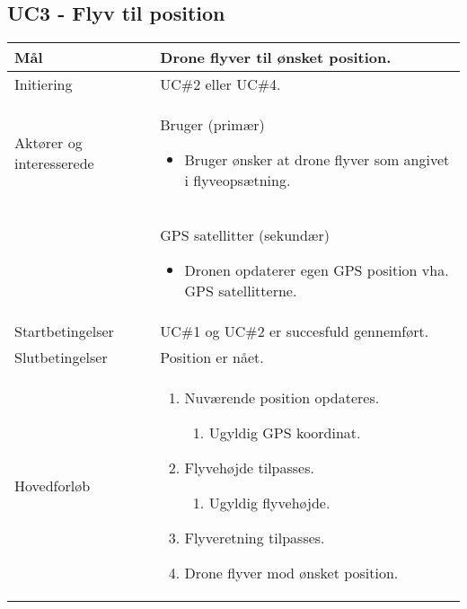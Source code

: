 \subsection*{UC3 - Flyv til position}

\begin{table}[H]
\begin{tabular}{| p{3cm}| p{11.5cm}|}
\hline


Mål	 							& Drone flyver til ønsket position. \\\hline
Initiering 							& UC\#2 eller UC\#4. \\\hline
Aktører og \newline interesserede			& Bruger (primær) 

										\begin{itemize}
											\item Bruger ønsker at drone flyver som angivet i flyveopsætning.
										\end{itemize} \\  
										
										& GPS satellitter (sekundær) 

										\begin{itemize}
											\item Dronen opdaterer egen GPS position vha. GPS satellitterne.
										\end{itemize} \\ \hline
Startbetingelser							& UC\#1 og UC\#2 er succesfuld gennemført. \\\hline
Slutbetingelser						& Position er nået. \\\hline
Hovedforløb				&
 
									\renewcommand{\labelenumi}{\arabic{enumi}.}
									\renewcommand{\labelenumii}{\Roman{enumii}:}

									\begin{enumerate}[topsep=0.0cm, leftmargin=0.5cm]
										\item Nuværende position opdateres.
											\begin{enumerate}[partopsep=4cm, topsep=0cm, leftmargin=1cm]
												\item Ugyldig GPS koordinat.
											\end{enumerate}
										\item Flyvehøjde tilpasses.
											\begin{enumerate}[partopsep=4cm, topsep=0cm, leftmargin=1cm]
												\item Ugyldig flyvehøjde.
											\end{enumerate}
										\item Flyveretning tilpasses.
										\item Drone flyver mod ønsket position.
									\end{enumerate} \\\hline	


\end{tabular}
\end{table}
